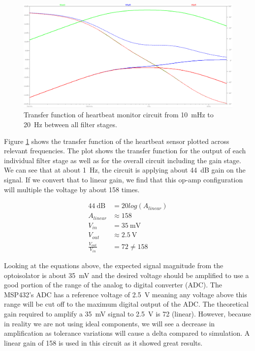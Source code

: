 \documentclass[CMPE]{../KGCOEReport}
\begin{document}
	 \begin{figure}[h!]
        \centering
        \includegraphics[width=12cm]{transfer}
        \caption{Transfer function of heartbeat monitor circuit from
        \SI{10}{\milli\hertz} to \SI{20}{\hertz} between all filter stages.}
        \label{fig:transfer}
	\end{figure}

	Figure \ref{fig:transfer} shows the transfer function of the heartbeat sensor
	plotted across relevant frequencies. The plot shows the transfer function for the
	output of each individual filter stage as well as for the overall circuit including
	the gain stage. We can see that at about \SI{1}{\hertz}, the circuit is applying
	about \SI{44}{\dB} gain on the signal. If we convert that to linear gain, we find
	that this op-amp configuration will multiple the voltage by about 158 times.

	\begin{align}
	\SI{44}{\dB} &= 20log(A_{linear})\\
	A_{linear} &\approx 158\\
	V_{in} &= \SI{35}{\milli\volt}\\
	V_{out} &\approx \SI{2.5}{\volt}\\
	\frac{V_{out}}{V_{in}} &= 72 \neq 158
	\end{align}

	Looking at the equations above, the expected signal magnitude from the optoisolator
	is about \SI{35}{\milli\volt} and the desired voltage should be amplified to use
	a good portion of the range of the analog to digital converter (ADC).
	The MSP432's ADC has a reference voltage of
	\SI{2.5}{\volt} meaning any voltage above this range will be cut off to the maximum
	digital output of the ADC. The theoretical gain required to amplify a
	\SI{35}{\milli\volt} signal to \SI{2.5}{\volt} is 72 (linear). However, because in
	reality we are not using ideal components, we will see a decrease in amplification
	as tolerance variations will cause a delta compared to simulation.
	A linear gain of 158 is used in this circuit as it showed great results.
\end{document}
